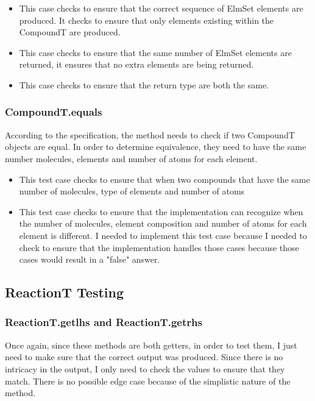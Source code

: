 \documentclass[12pt]{article}
\begin{document}
\begin{itemize}
  \item This case checks to ensure that the correct sequence of ElmSet elements are produced. It checks to ensure that only elements existing within the CompoundT are produced.
  \item This case checks to ensure that the same number of ElmSet elements are returned, it ensures that no extra elements are being returned.
  \item This case checks to ensure that the return type are both the same.
\end{itemize}

\subsubsection{CompoundT.equals}
According to the specification, the method needs to check if two CompoundT objects are equal.
In order to determine equivalence, they need to have the same number molecules, elements and number of atoms
for each element.

\begin{itemize}
  \item This test case checks to ensure that when two compounds that have the same number of molecules, type of elements and number of atoms
  \item This test case checks to ensure that the implementation can recognize when the number of molecules, element composition and number of atoms for each element is different.
  I needed to implement this test case because I needed to check to ensure that the implementation handles those cases because those cases would result in a "false" answer.
\end{itemize}


\subsection{ReactionT Testing}

\subsubsection{ReactionT.get\textunderscore lhs and ReactionT.get\textunderscore rhs}
Once again, since these methods are both getters, in order to test them, I just need to make sure that the correct output was produced. Since there 
is no intricacy in the output, I only need to check the values to ensure that they match. There is no possible edge case because of the simplistic nature of the method.
\end{document}
